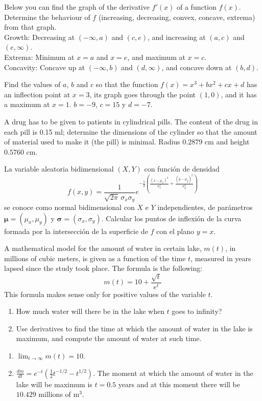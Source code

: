 
{ Below you can find the graph of the derivative $f'(x)$ of a function $f(x)$.
Determine the behaviour of $f$ (increasing, decreasing, convex, concave, extrema) from that graph.
\[

\]
}
{Growth: Decreasing at $(-\infty,a)$ and $(c,e)$, and increasing at $(a,c)$ and $(e,\infty)$.\\
Extrema: Minimum at $x=a$ and $x=e$, and maximum at $x=c$.\\
Concavity: Concave up at $(-\infty,b)$ and $(d,\infty)$, and concave down at $(b,d)$.
}
{
}

{Find the values of $a$, $b$ and $c$ so that the function $f(x)=x^3+bx^2+cx+d$ has an inflection point at $x=3$, its graph goes
through the point $(1,0)$, and it has a maximum at $x=1$.
}
{$b=-9$, $c=15$ y $d=-7$.
}
{
}

{A drug has to be given to patients in cylindrical pills.
The content of the drug in each pill is 0.15 ml; determine the dimensions of the cylinder so that the amount of material used to make it (the pill)
is minimal.
}
{Radius $0.2879$ cm and height $0.5760$ cm.
}
{
}


{La variable aleatoria bidimensional $(X,Y)$ con función de densidad
\[
f(x,y) = \frac{1}{\sqrt{2\pi}\, \sigma_x\sigma_y} e^{-\frac{1}{2}\left(\frac{(x-\mu_x)^2}{\sigma_x^2}+\frac{(y-\mu_y)^2}{\sigma_y^2}\right)}
\]
se conoce como normal bidimensional con $X$ e $Y$ independientes, de parámetros $\mathbf{\mu}=(\mu_x,\mu_y)$ y $\mathbf{\sigma}=(\sigma_x,\sigma_y)$.
Calcular los puntos de inflexión de la curva formada por la intersección de la superficie de $f$ con el plano $y=x$.
}


{A mathematical model for the amount of water in certain lake, $m(t)$, in millions of cubic meters, is given as a function of the time
$t$, measured in years lapsed since the study took place.
The formula is the following:
\[
m(t) = 10 + \frac{{\sqrt t }} {{e^t }}
\]
This formula makes sense only for positive values of the variable $t$.
\begin{enumerate}
\item How much water will there be in the lake when $t$ goes to infinity?
\item Use derivatives to find the time at which the amount of water in the lake is maximum, and compute the amount of water at such time.
\end{enumerate}
}
{\begin{enumerate}
\item $\lim_{t\rightarrow \infty}m(t) = 10$.
\item $\frac{dm}{dt}=e^{-t}(\frac{1}{2}t^{-1/2}-t^{1/2})$. The moment at which the amount of water in the lake will be maximum is $t=0.5$ years and at this moment there will be $10.429$ millions of m$^3$.
\end{enumerate}
}
{
}


